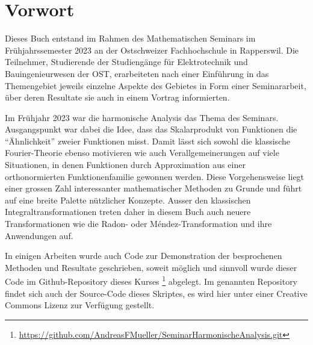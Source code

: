 %
%
%
\chapter*{Vorwort}
\rhead{}
Dieses Buch entstand im Rahmen des Mathematischen Seminars
im Frühjahrssemester 2023 an der Ostschweizer Fachhochschule in Rapperswil.
Die Teilnehmer, Studierende der Studiengänge für Elektrotechnik
und Bauingenieurwesen
der OST, erarbeiteten nach einer Einführung in das Themengebiet jeweils
einzelne Aspekte des Gebietes in Form einer Seminararbeit, über
deren Resultate sie auch in einem Vortrag informierten. 

Im Frühjahr 2023 war die harmonische Analysis das Thema des Seminars.
Ausgangspunkt war dabei die Idee, dass das Skalarprodukt von Funktionen
die ``Ähnlichkeit'' zweier Funktionen misst.
Damit lässt sich sowohl die klassische Fourier-Theorie ebenso motivieren
wie auch Verallgemeinerungen auf viele Situationen, in denen Funktionen
durch Approximation aus einer orthonormierten Funktionenfamilie gewonnen
werden.
Diese Vorgehensweise liegt einer grossen Zahl interessanter mathematischer
Methoden zu Grunde und führt auf eine breite Palette nützlicher
Konzepte.
Ausser den klassischen Integraltransformationen treten daher in diesem
Buch auch neuere Transformationen wie die Radon- oder M\'endez-Transformation
und ihre Anwendungen auf.

In einigen Arbeiten wurde auch Code zur Demonstration der 
besprochenen Methoden und Resultate geschrieben, soweit
möglich und sinnvoll wurde dieser Code im Github-Repository
%
dieses Kurses%
\footnote{\url{https://github.com/AndreasFMueller/SeminarHarmonischeAnalysis.git}}
\cite{buch:repo}
abgelegt.
Im genannten Repository findet sich auch der Source-Code dieses
Skriptes, es wird hier unter einer Creative Commons Lizenz
zur Verfügung gestellt.

